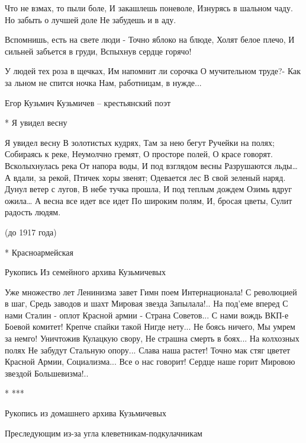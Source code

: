 Что не взмах, то пыли боле,
И закашлешь поневоле,
          Изнурясь в шальном чаду.
Но забыть о лучшей доле
          Не забудешь и в аду.

Вспомнишь, есть на свете люди -
Точно яблоко на блюде,
          Холят белое плечо,
И сильней забъется в груди,
          Вспыхнув сердце горячо!

У людей тех роза в щечках,
Им напомнит ли сорочка
          О мучительном труде?-
Как за льном не спится ночка
          Нам, работницам, в нужде...

﻿Егор Кузьмич Кузьмичев – крестьянский поэт


* Я увидел весну

Я увидел весну
     В золотистых кудрях,
Там за нею бегут
     Ручейки на полях;
Собираясь к реке,
     Неумолчно гремят,
О просторе полей,
     О красе говорят.
Всколыхнулась река
     От напора воды,
И под взглядом весны
     Разрушаются льды…
А вдали, за рекой,
     Птичек хоры звенят;
Одевается лес
     В свой зеленый наряд.
Дунул ветер с лугов,
     В небе тучка прошла,
И под теплым дождем
     Озимь вдруг ожила…
А весна все идет все идет
     По широким полям,
И, бросая цветы,
     Сулит радость людям.

(до 1917 года)


* Красноармейская

Рукопись
Из семейного архива Кузьмичевых

Уже множество лет
Ленинизма завет
    Гимн поем
    Интернационала!
С революцией в шаг,
Средь заводов и шахт
    Мировая звезда
    Запылала!..
На под'еме вперед
С нами Сталин - оплот
    Красной армии -
    Страна Советов...
С нами вождь ВКП-е
Боевой комитет!
    Крепче спайки такой
    Нигде нету...
Не боясь ничего,
Мы умрем за немго!
    Уничтожив
    Кулацкую свору,
Не страшна смерть в боях...
На колхозных полях
    Не забудут
    Стальную опору...
Слава наша растет!
Точно мак стяг цветет
    Красной Армии,
    Социализма...
Все о нас говорит!
Сердце наше горит
    Мировою звездой
    Большевизма!..


* ***

Рукопись из домашнего архива Кузьмичевых

    Преследующим из-за угла
    клеветникам-подкулачникам

